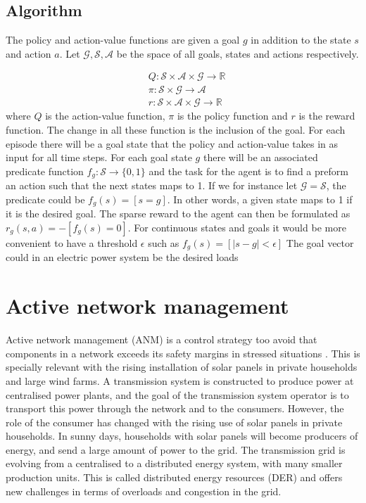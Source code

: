 \documentclass[class=book, crop=false, 11pt]{standalone}
\begin{document}
\subsection{Algorithm}

The policy and action-value functions are given a goal $g$ in addition to the state $s$ and action $a$. Let $\mathcal{G}, \mathcal{S}, \mathcal{A}$ be the space of all goals, states and actions respectively. 

\begin{equation}
   \begin{aligned}
   \label{eq:theory:her_function_with_goal}
    &Q: \mathcal{S} \times \mathcal{A} \times \mathcal{G} \to \mathbb{R}
    \\
    &\pi: \mathcal{S} \times \mathcal{G} \to \mathcal{A}
    \\
    &r: \mathcal{S} \times \mathcal{A} \times \mathcal{G} \to \mathbb{R}
    \end{aligned} 
\end{equation}
where $Q$ is the action-value function, $\pi$ is the policy function and $r$ is the reward function. The change in all these function is the inclusion of the goal. For each episode there will be a goal state that the policy and action-value takes in as input for all time steps. For each goal state $g$ there will be an associated predicate function $f_{g}: \mathcal{S} \to \{0,1\}$ and the task for the agent is to find a preform an action such that the next states maps to 1. If we for instance let $\mathcal{G} = \mathcal{S}$, the predicate could be $f_{g}(s) = [s=g]$. In other words, a given state maps to 1 if it is the desired goal. The sparse reward to the agent can then be formulated as $r_{g}(s,a) = -[f_{g}(s)=0]$. For continuous states and goals it would be more convenient to have a threshold $\epsilon$ such as $f_{g}(s) = [|s-g| < \epsilon]$ The goal vector could in an electric power system be the desired loads




\section{Active network management}
Active network management (ANM) is a control strategy too avoid that components in a network exceeds its safety margins in stressed situations \cite{active_network_management}. This is specially relevant with the rising installation of solar panels in private households and large wind farms. A transmission system is constructed to produce power at centralised power plants, and the goal of the transmission system operator is to transport this power through the network and to the consumers. However, the role of the consumer has changed with the rising use of solar panels in private households. In sunny days, households with solar panels will become producers of energy, and send a large amount of power to the grid. The transmission grid is evolving from a centralised to a distributed energy system, with many smaller production units. This is called distributed energy resources (DER) and offers new challenges in terms of overloads and congestion in the grid. 
\end{document}
